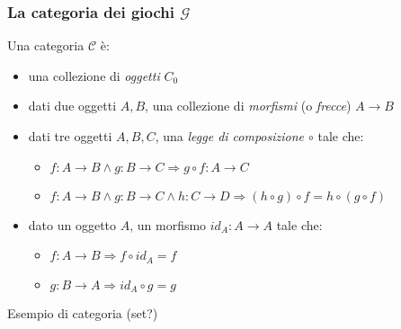 \documentclass{beamer}
\begin{document}
\begin{frame}
	
	\frametitle{La categoria dei giochi $\mathcal{G}$}
	
	Una categoria $\mathcal{C}$ è:
	\begin{itemize}
		\item una collezione di \emph{oggetti} $C_0$
		\item dati due oggetti $A,B$, una collezione di \emph{morfismi} (o \emph{frecce}) $A \rightarrow B$
		\item dati tre oggetti $A,B,C$, una \emph{legge di composizione $\circ$} tale che:
		\begin{itemize}
			\item $f: A \rightarrow B \wedge g: B \rightarrow C \Rightarrow g\circ f : A \rightarrow C$
			\item $f: A \rightarrow B \wedge g: B \rightarrow C \wedge h: C \rightarrow D \Rightarrow (h\circ g) \circ f = h \circ (g \circ f)$
		\end{itemize}
		\item dato un oggetto $A$, un morfismo $id_A: A\rightarrow A$ tale che:
		\begin{itemize}
			\item $f: A \rightarrow B \Rightarrow f \circ id_A = f$
			\item $g: B \rightarrow A \Rightarrow id_A \circ g = g$
		\end{itemize}

	\end{itemize}
	
\end{frame}


\begin{frame}
	
	Esempio di categoria (set?)
	
\end{frame}
\end{document}
